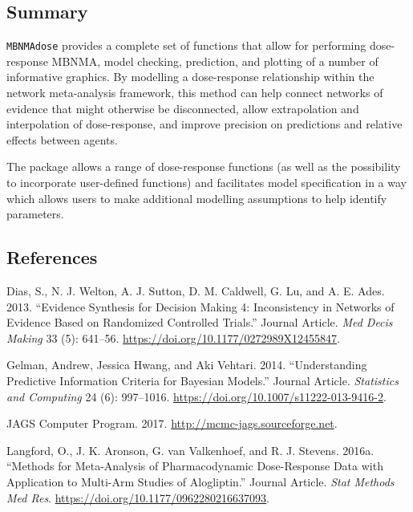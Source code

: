 \documentclass[]{article}
\begin{document}
\hypertarget{summary}{%
\subsection{Summary}\label{summary}}

\texttt{MBNMAdose} provides a complete set of functions that allow for
performing dose-response MBNMA, model checking, prediction, and plotting
of a number of informative graphics. By modelling a dose-response
relationship within the network meta-analysis framework, this method can
help connect networks of evidence that might otherwise be disconnected,
allow extrapolation and interpolation of dose-response, and improve
precision on predictions and relative effects between agents.

The package allows a range of dose-response functions (as well as the
possibility to incorporate user-defined functions) and facilitates model
specification in a way which allows users to make additional modelling
assumptions to help identify parameters.

\hypertarget{references}{%
\subsection*{References}\label{references}}

\hypertarget{refs}{}
\leavevmode\hypertarget{ref-dias2013}{}%
Dias, S., N. J. Welton, A. J. Sutton, D. M. Caldwell, G. Lu, and A. E.
Ades. 2013. ``Evidence Synthesis for Decision Making 4: Inconsistency in
Networks of Evidence Based on Randomized Controlled Trials.'' Journal
Article. \emph{Med Decis Making} 33 (5): 641--56.
\url{https://doi.org/10.1177/0272989X12455847}.

\leavevmode\hypertarget{ref-gelman2014}{}%
Gelman, Andrew, Jessica Hwang, and Aki Vehtari. 2014. ``Understanding
Predictive Information Criteria for Bayesian Models.'' Journal Article.
\emph{Statistics and Computing} 24 (6): 997--1016.
\url{https://doi.org/10.1007/s11222-013-9416-2}.

\leavevmode\hypertarget{ref-jags}{}%
JAGS Computer Program. 2017. \url{http://mcmc-jags.sourceforge.net}.

\leavevmode\hypertarget{ref-thorlund2014}{}%
Langford, O., J. K. Aronson, G. van Valkenhoef, and R. J. Stevens.
2016a. ``Methods for Meta-Analysis of Pharmacodynamic Dose-Response Data
with Application to Multi-Arm Studies of Alogliptin.'' Journal Article.
\emph{Stat Methods Med Res}.
\url{https://doi.org/10.1177/0962280216637093}.
\end{document}
